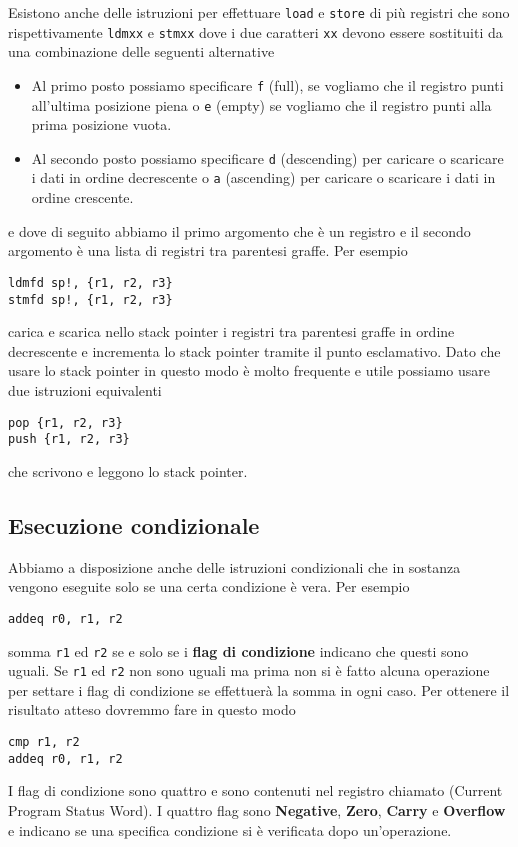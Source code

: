 Esistono anche delle istruzioni per effettuare \verb|load| e \verb|store| di più registri che sono
rispettivamente \verb|ldmxx| e \verb|stmxx| dove i due caratteri \verb|xx| devono essere sostituiti
da una combinazione delle seguenti alternative
\begin{itemize}
	\item Al primo posto possiamo specificare \verb|f| (full), se vogliamo che il registro punti
	      all'ultima posizione piena o \verb|e| (empty) se vogliamo che il registro punti alla
	      prima posizione vuota.
	\item Al secondo posto possiamo specificare \verb|d| (descending) per caricare o scaricare i
	      dati in ordine decrescente o \verb|a| (ascending) per caricare o scaricare i dati in
	      ordine crescente.
\end{itemize}
e dove di seguito abbiamo il primo argomento che è un registro e il secondo argomento è una lista
di registri tra parentesi graffe. Per esempio
\begin{verbatim}
ldmfd sp!, {r1, r2, r3}
stmfd sp!, {r1, r2, r3}
\end{verbatim}
carica e scarica nello stack pointer i registri tra parentesi graffe in ordine decrescente e
incrementa lo stack pointer tramite il punto esclamativo. Dato che usare lo stack pointer in questo
modo è molto frequente e utile possiamo usare due istruzioni equivalenti
\begin{verbatim}
pop {r1, r2, r3}
push {r1, r2, r3}
\end{verbatim}
che scrivono e leggono lo stack pointer.

\subsection{Esecuzione condizionale}
Abbiamo a disposizione anche delle istruzioni condizionali che in sostanza vengono eseguite solo se
una certa condizione è vera. Per esempio
\begin{verbatim}
addeq r0, r1, r2
\end{verbatim}
somma \verb|r1| ed \verb|r2| se e solo se i \textbf{flag di condizione} indicano che questi sono
uguali. Se \verb|r1| ed \verb|r2| non sono uguali ma prima non si è fatto alcuna operazione per
settare i flag di condizione se effettuerà la somma in ogni caso. Per ottenere il risultato atteso
dovremmo fare in questo modo
\begin{verbatim}
cmp r1, r2
addeq r0, r1, r2
\end{verbatim}
I flag di condizione sono quattro e sono contenuti nel registro chiamato  (Current
Program Status Word). I quattro flag sono \textbf{Negative}, \textbf{Zero}, \textbf{Carry} e
\textbf{Overflow} e indicano se una specifica condizione si è verificata dopo un'operazione.

